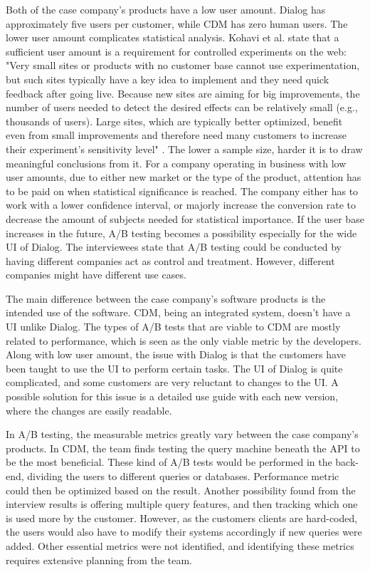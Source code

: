 \documentclass[english]{tktltiki2}
\theoremstyle{definition}
\theoremstyle{remark}
\begin{document}
Both of the case company's products have a low user amount. Dialog has approximately five users per customer, while CDM has zero human users. The lower user amount complicates statistical analysis. Kohavi et al. state that a sufficient user amount is a requirement for controlled experiments on the web: "Very small sites or products with no customer base cannot use experimentation, but such sites typically have a key idea to implement and they need quick feedback after going live. Because new sites are aiming for big improvements, the number of users needed to detect the desired effects can be relatively small (e.g., thousands of users). Large sites, which are typically better optimized, benefit even from small improvements and therefore need many customers to increase their experiment’s sensitivity level" \cite{kohavi2009online}. The lower a sample size, harder it is to draw meaningful conclusions from it. For a company operating in business with low user amounts, due to either new market or the type of the product, attention has to be paid on when statistical significance is reached. The company either has to work with a lower confidence interval, or majorly increase the conversion rate to decrease the amount of subjects needed for statistical importance. If the user base increases in the future, A/B testing becomes a possibility especially for the wide UI of Dialog. The interviewees state that A/B testing could be conducted by having different companies act as control and treatment. However, different companies might have different use cases.

The main difference between the case company's software products is the intended use of the software. CDM, being an integrated system, doesn't have a UI unlike Dialog. The types of A/B tests that are viable to CDM are mostly related to performance, which is seen as the only viable metric by the developers. Along with low user amount, the issue with Dialog is that the customers have been taught to use the UI to perform certain tasks. The UI of Dialog is quite complicated, and some customers are very reluctant to changes to the UI. A possible solution for this issue is a detailed use guide with each new version, where the changes are easily readable. 

In A/B testing, the measurable metrics greatly vary between the case company's products. In CDM, the team finds testing the query machine beneath the API to be the most beneficial. These kind of A/B tests would be performed in the back-end, dividing the users to different queries or databases. Performance metric could then be optimized based on the result. Another possibility found from the interview results is offering multiple query features, and then tracking which one is used more by the customer. However, as the customers clients are hard-coded, the users would also have to modify their systems accordingly if new queries were added. Other essential metrics were not identified, and identifying these metrics requires extensive planning from the team.
\end{document}

